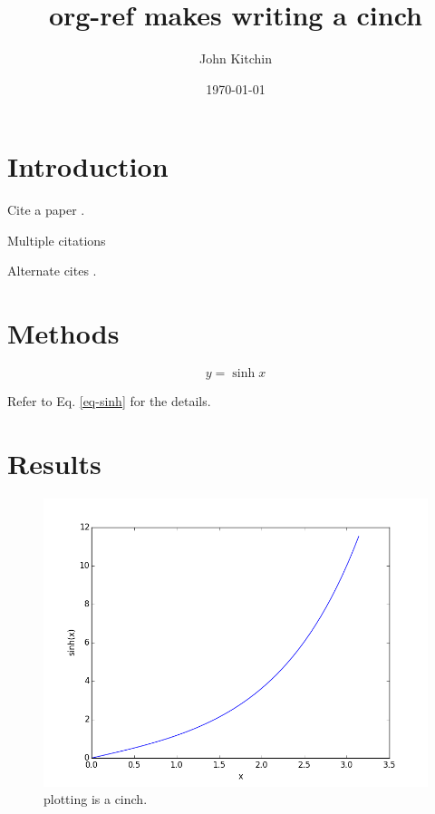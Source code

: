 \documentclass[11pt]{article}
\author{John Kitchin}
\date{\today}
\title{org-ref makes writing a cinch}
\begin{document}
\maketitle

\section{Introduction}
\label{sec:orgheadline1}

Cite a paper \cite{kitchin-2004-role-strain}.

Multiple citations \cite{kitchin-2004-role-strain,mehta-2014-ident-poten}

Alternate cites .

\section{Methods}
\label{sec:orgheadline2}

\begin{equation} \label{eq-sinh}
y = \sinh x
\end{equation}

Refer to Eq. \eqref{eq-sinh} for the details.

\section{Results}
\label{sec:orgheadline3}

\begin{figure}[H]
\centering
\includegraphics[width=.9\linewidth]{./sinh.png}
\caption{plotting is a cinch. \label{fig-cinch}}
\end{figure}
\end{document}
